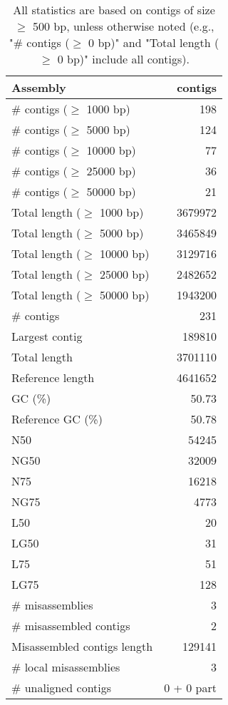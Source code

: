 \documentclass[12pt,a4paper]{article}
\begin{document}
\begin{table}[ht]
\begin{center}
\caption{All statistics are based on contigs of size $\geq$ 500 bp, unless otherwise noted (e.g., "\# contigs ($\geq$ 0 bp)" and "Total length ($\geq$ 0 bp)" include all contigs).}
\begin{tabular}{|l*{1}{|r}|}
\hline
Assembly & contigs \\ \hline
\# contigs ($\geq$ 1000 bp) & 198 \\ \hline
\# contigs ($\geq$ 5000 bp) & 124 \\ \hline
\# contigs ($\geq$ 10000 bp) & 77 \\ \hline
\# contigs ($\geq$ 25000 bp) & 36 \\ \hline
\# contigs ($\geq$ 50000 bp) & 21 \\ \hline
Total length ($\geq$ 1000 bp) & 3679972 \\ \hline
Total length ($\geq$ 5000 bp) & 3465849 \\ \hline
Total length ($\geq$ 10000 bp) & 3129716 \\ \hline
Total length ($\geq$ 25000 bp) & 2482652 \\ \hline
Total length ($\geq$ 50000 bp) & 1943200 \\ \hline
\# contigs & 231 \\ \hline
Largest contig & 189810 \\ \hline
Total length & 3701110 \\ \hline
Reference length & 4641652 \\ \hline
GC (\%) & 50.73 \\ \hline
Reference GC (\%) & 50.78 \\ \hline
N50 & 54245 \\ \hline
NG50 & 32009 \\ \hline
N75 & 16218 \\ \hline
NG75 & 4773 \\ \hline
L50 & 20 \\ \hline
LG50 & 31 \\ \hline
L75 & 51 \\ \hline
LG75 & 128 \\ \hline
\# misassemblies & 3 \\ \hline
\# misassembled contigs & 2 \\ \hline
Misassembled contigs length & 129141 \\ \hline
\# local misassemblies & 3 \\ \hline
\# unaligned contigs & 0 + 0 part \\ \hline

\end{tabular}
\end{center}
\end{table}
\end{document}

